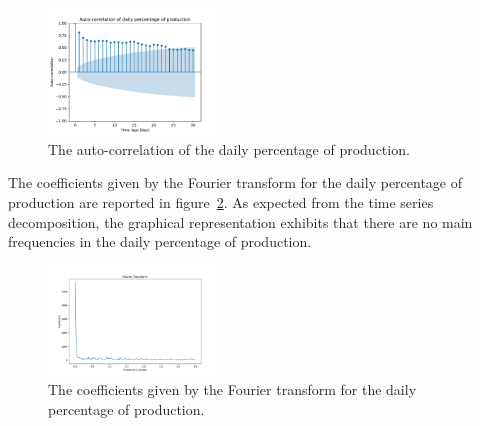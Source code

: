 \begin{figure}[H]
\centering
\includegraphics[width=0.4\textwidth]{images/production/daily_aggregated_correlation}
\caption{The auto-correlation of the daily percentage of production.}
\label{fig:productioncorrelationday}
\end{figure}

The coefficients given by the Fourier transform for the daily percentage of production are reported in figure~\ref{fig:productionftday}.
As expected from the time series decomposition, the graphical representation exhibits that there are no main frequencies in the daily percentage of production.

\begin{figure}[H]
\centering
\includegraphics[width=0.4\textwidth]{images/production/ft_day}
\caption{The coefficients given by the Fourier transform for the daily percentage of production.}
\label{fig:productionftday}
\end{figure}

